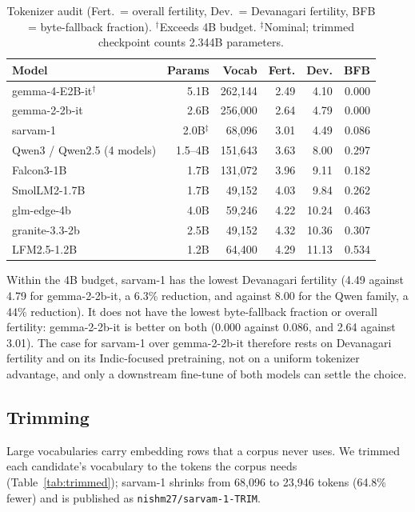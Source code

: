 \documentclass[10pt,twocolumn,letterpaper]{article}
\begin{document}
\begin{table}[t]
\centering
\small
\setlength{\tabcolsep}{3pt}
\begin{tabular}{@{}lrrrrr@{}}
\toprule
\textbf{Model} & \textbf{Params} & \textbf{Vocab} & \textbf{Fert.} & \textbf{Dev.} & \textbf{BFB} \\
\midrule
gemma-4-E2B-it$^\dagger$    & 5.1B  & 262{,}144 & 2.49 & 4.10 & 0.000 \\
gemma-2-2b-it               & 2.6B  & 256{,}000 & 2.64 & 4.79 & 0.000 \\
sarvam-1                    & 2.0B$^\ddagger$ &  68{,}096 & 3.01 & 4.49 & 0.086 \\
Qwen3 / Qwen2.5 (4 models)  & 1.5--4B & 151{,}643 & 3.63 & 8.00 & 0.297 \\
Falcon3-1B                  & 1.7B  & 131{,}072 & 3.96 & 9.11 & 0.182 \\
SmolLM2-1.7B                & 1.7B  &  49{,}152 & 4.03 & 9.84 & 0.262 \\
glm-edge-4b                 & 4.0B  &  59{,}246 & 4.22 & 10.24 & 0.463 \\
granite-3.3-2b              & 2.5B  &  49{,}152 & 4.32 & 10.36 & 0.307 \\
LFM2.5-1.2B                 & 1.2B  &  64{,}400 & 4.29 & 11.13 & 0.534 \\
\bottomrule
\end{tabular}
\caption{Tokenizer audit (Fert.\ = overall fertility, Dev.\ = Devanagari
fertility, BFB = byte-fallback fraction). $^\dagger$Exceeds 4B budget.
$^\ddagger$Nominal; trimmed checkpoint counts 2.344B parameters.}
\label{tab:trimming}
\end{table}

Within the 4B budget, sarvam-1 has the lowest Devanagari fertility (4.49 against
4.79 for gemma-2-2b-it, a 6.3\% reduction, and against 8.00 for the Qwen family,
a 44\% reduction). It does not have the lowest byte-fallback fraction or overall
fertility: gemma-2-2b-it is better on both (0.000 against 0.086, and 2.64 against
3.01). The case for sarvam-1 over gemma-2-2b-it therefore rests on Devanagari
fertility and on its Indic-focused pretraining, not on a uniform tokenizer
advantage, and only a downstream fine-tune of both models can settle the choice.

\subsection{Trimming}

Large vocabularies carry embedding rows that a corpus never uses. We trimmed each
candidate's vocabulary to the tokens the corpus needs (Table~\ref{tab:trimmed});
sarvam-1 shrinks from 68{,}096 to 23{,}946 tokens (64.8\% fewer) and is published
as \texttt{nishm27/sarvam-1-TRIM}.
\end{document}
